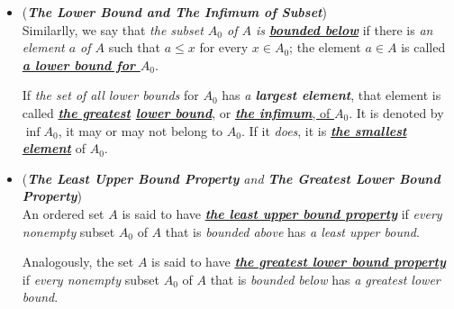 \documentclass[11pt]{article}
\begin{document}
\begin{itemize}
\item \begin{definition} (\emph{\textbf{The Lower Bound and The Infimum of Subset}})\\
Similarlly, we say that \emph{the subset $A_0$ of $A$ is \underline{\textbf{bounded below}}} if there is \emph{an element $a$ of $A$} such that $a \le x$ for every $x \in A_0$; the element $a \in A$ is called \underline{\emph{\textbf{a lower bound for $A_0$}}}. 

If \emph{the set of all lower bounds} for $A_0$ has \emph{a \textbf{largest element}}, that element is called \emph{\textbf{\underline{the greatest} \underline{lower bound}}}, or \underline{\emph{\textbf{the infimum}}, of $A_0$}. It is denoted by $\inf A_0$, it may or may not belong to $A_0$. If it \emph{does}, it is \emph{\textbf{\underline{the smallest element}}} of $A_0$.
\end{definition}

\item \begin{definition} (\textit{\textbf{The Least Upper Bound Property} and \textbf{The Greatest Lower Bound Property}})\\
An ordered set $A$ is said to have \underline{\emph{\textbf{the least upper bound property}}} if \emph{every} \emph{nonempty} subset $A_0$ of $A$ that is \emph{bounded above} has \emph{a least upper bound}. 

Analogously, the set $A$ is said to have \underline{\emph{\textbf{the greatest lower bound property}}} if \emph{every nonempty} subset $A_0$ of $A$ that is \emph{bounded below} has \emph{a greatest lower bound}.
\end{definition}
\end{itemize}
\end{document}
